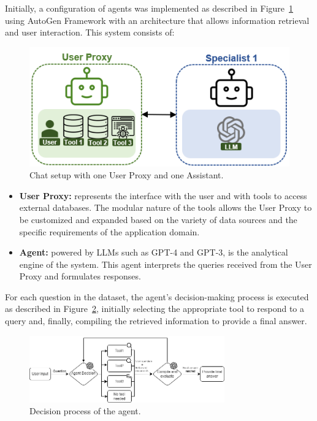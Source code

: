             Initially, a configuration of agents was implemented as described in Figure~\ref{fig:agent_config_1} using AutoGen Framework \cite{Wu2023} with an architecture that allows information retrieval and user interaction. This system consists of:

            \begin{figure}[h]
                \centering
                \includegraphics[width=.5\textwidth]{images/agent_config_1.png}
                \caption{Chat setup with one User Proxy \cite{Wu2023} and one Assistant.}
                \label{fig:agent_config_1}
            \end{figure}
            

            \begin{itemize}        
                        
                \item \textbf{User Proxy:} represents the interface with the user and with tools to access external databases. The modular nature of the tools allows the User Proxy to be customized and expanded based on the variety of data sources and the specific requirements of the application domain.

                \item \textbf{Agent:} powered by LLMs such as GPT-4 and GPT-3, is the analytical engine of the system. This agent interprets the queries received from the User Proxy and formulates responses.
                                    
            \end{itemize}

            
            For each question in the dataset, the agent's decision-making process is executed as described in Figure~\ref{fig:diagrama_agente_1}, initially selecting the appropriate tool to respond to a query and, finally, compiling the retrieved information to provide a final answer.
            
            \begin{figure}[h]
                \centering
                \includegraphics[width=0.75\textwidth]{images/agent_diagram_1.png}
                \caption{Decision process of the agent.}
                \label{fig:diagrama_agente_1}
            \end{figure}                        
                    
